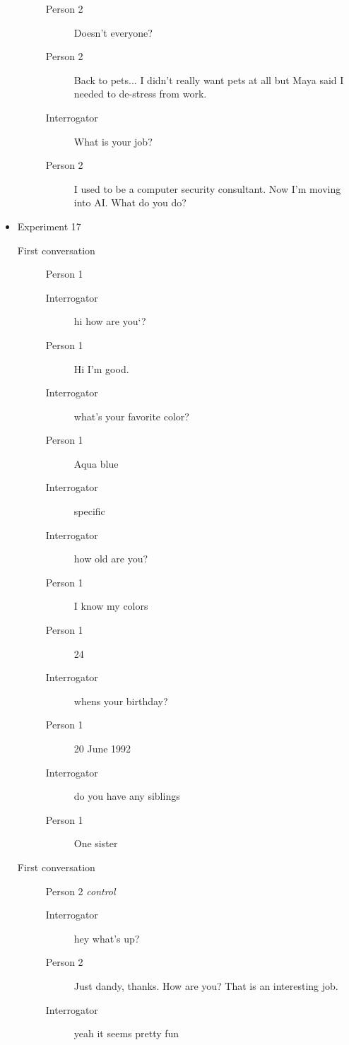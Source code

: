\begin{itemize}
\begin{description}
\begin{description}
               \item [Person 2] Doesn't everyone?
               \item [Person 2] Back to pets... I didn't really want pets at all but Maya said I needed to de-stress from work.
               \item [Interrogator] What is your job?
               \item [Person 2] I used to be a computer security consultant. Now I'm moving into AI. What do you do?
            \end{description}
      \end{description}

   \item Experiment 17
      \begin{description}
         \item [First conversation] Person 1
            \begin{description}
               \item [Interrogator] hi how are you`?
               \item [Person 1] Hi I'm good.
               \item [Interrogator] what's your favorite color?
               \item [Person 1] Aqua blue
               \item [Interrogator] specific
               \item [Interrogator] how old are you?
               \item [Person 1] I know my colors
               \item [Person 1] 24
               \item [Interrogator] whens your birthday?
               \item [Person 1] 20 June 1992
               \item [Interrogator] do you have any siblings
               \item [Person 1] One sister
            \end{description}
         \item [First conversation] Person 2 \textit{control}
            \begin{description}
               \item [Interrogator] hey what's up?
               \item [Person 2] Just dandy, thanks. How are you? That is an interesting job.
               \item [Interrogator] yeah it seems pretty fun

\end{description}
\end{description}
\end{itemize}
